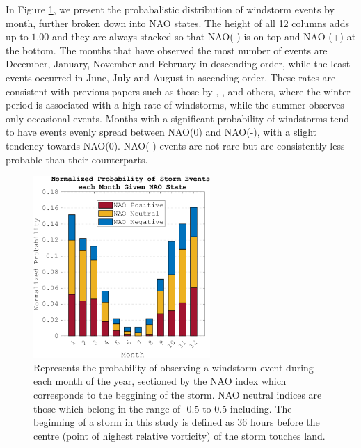     In Figure \ref{fig:normalized_probability_of_storm_events_with_NAO}, we present the probabalistic distribution of windstorm events by month, further broken down into NAO states. The height of all 12 columns adds up to $1.00$ and they are always stacked so that NAO(-) is on top and NAO (+) at the bottom. The months that have observed the most number of events are December, January, November and February in descending order, while the least events occurred in June, July and August in ascending order. These rates are consistent with previous papers such as those by \cite{Hurrell2003}, \cite{Renggli2011}, and others, where the winter period is associated with a high rate of windstorms, while the summer observes only occasional events. Months with a significant probability of windstorms tend to have events evenly spread between NAO(0) and NAO(-), with a slight tendency towards NAO(0). NAO(-) events are not rare but are consistently less probable than their counterparts.

        \begin{figure}
            \centering
            \includegraphics[width=0.6\textwidth]{figures/Normalized Probability of Storm Events Given NAO State(small).png}
            \caption{Represents the probability of observing a windstorm event during each month of the year, sectioned by the NAO index which corresponds to the beggining of the storm. NAO neutral indices are those which belong in the range of -0.5 to 0.5 including. The beginning of a storm in this study is defined as 36 hours before the centre (point of highest relative vorticity) of the storm touches land.}
            \label{fig:normalized_probability_of_storm_events_with_NAO}
        \end{figure}

